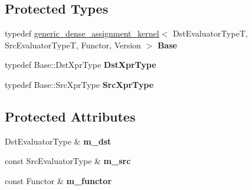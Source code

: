 \subsection*{Protected Types}
\begin{DoxyCompactItemize}
\item 
\mbox{\label{class_eigen_1_1internal_1_1triangular__dense__assignment__kernel_ac01443bfa6fe11b6eca22720a34b5eb3}} 
typedef \mbox{\hyperlink{class_eigen_1_1internal_1_1generic__dense__assignment__kernel}{generic\+\_\+dense\+\_\+assignment\+\_\+kernel}}$<$ Dst\+Evaluator\+TypeT, Src\+Evaluator\+TypeT, Functor, Version $>$ {\bfseries Base}
\item 
\mbox{\label{class_eigen_1_1internal_1_1triangular__dense__assignment__kernel_ace1ab495e32ff0d545c8ca8fd2757111}} 
typedef Base\+::\+Dst\+Xpr\+Type {\bfseries Dst\+Xpr\+Type}
\item 
\mbox{\label{class_eigen_1_1internal_1_1triangular__dense__assignment__kernel_a31397394870e64f33a78a3a666b48d03}} 
typedef Base\+::\+Src\+Xpr\+Type {\bfseries Src\+Xpr\+Type}
\end{DoxyCompactItemize}
\subsection*{Protected Attributes}
\begin{DoxyCompactItemize}
\item 
\mbox{\label{class_eigen_1_1internal_1_1triangular__dense__assignment__kernel_a8df443ccdd70a127d6c6bc4578ca1660}} 
Dst\+Evaluator\+Type \& {\bfseries m\+\_\+dst}
\item 
\mbox{\label{class_eigen_1_1internal_1_1triangular__dense__assignment__kernel_a415b02ffc7e2621aac6b375240f42ae8}} 
const Src\+Evaluator\+Type \& {\bfseries m\+\_\+src}
\item 
\mbox{\label{class_eigen_1_1internal_1_1triangular__dense__assignment__kernel_a9823fd7d0d9532d51d9c16b4c4fd677f}} 
const Functor \& {\bfseries m\+\_\+functor}
\end{DoxyCompactItemize}
